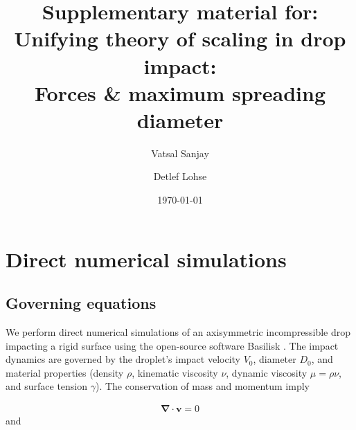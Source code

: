 \documentclass[reprint,amssymb,superscriptaddress,aps,prfluids,onecolumn]{revtex4-1}
\begin{document}
	

\title{Supplementary material for: \\
	Unifying theory of scaling in drop impact:\\ Forces \& maximum spreading diameter}%

\author{Vatsal Sanjay}
\author{Detlef Lohse}

\date{\today}


\maketitle

\tableofcontents


\section{Direct numerical simulations}\label{sec:NumMethods}

\subsection{Governing equations}

We perform direct numerical simulations of an axisymmetric incompressible drop impacting a rigid surface using the open-source software Basilisk \cite{popinet-basilisk}. The impact dynamics are governed by the droplet's impact velocity $V_0$, diameter $D_0$, and material properties (density $\rho$, kinematic viscosity $\nu$, dynamic viscosity $\mu = \rho\nu$, and surface tension $\gamma$). The conservation of mass and momentum imply

\begin{align}
	\label{eqn:continuity}
	\boldsymbol{\nabla\cdot v} = 0
\end{align}
and
\end{document}
